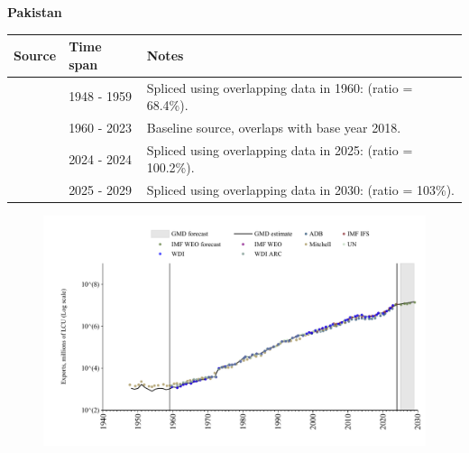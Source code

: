 \documentclass[12pt,a4paper,landscape]{article}
\begin{document}
\begin{adjustbox}{max totalsize={\paperwidth}{\paperheight},center}
\begin{minipage}[t][\textheight][t]{\textwidth}
\vspace*{0.5cm}
{}
\begin{center}
{\Large\bfseries Pakistan}
\end{center}
\vspace{0.5cm}
\begin{table}[H]
\centering
\small
\begin{tabular}{|l|l|l|}
\hline
\textbf{Source} & \textbf{Time span} & \textbf{Notes} \\
\hline
\rowcolor{white}\cite{Mitchell}& 1948 - 1959 &Spliced using overlapping data in 1960: (ratio = 68.4\%).\\
\rowcolor{lightgray}\cite{WDI}& 1960 - 2023 &Baseline source, overlaps with base year 2018.\\
\rowcolor{white}\cite{IMF_IFS}& 2024 - 2024 &Spliced using overlapping data in 2025: (ratio = 100.2\%).\\
\rowcolor{lightgray}\cite{IMF_WEO_forecast}& 2025 - 2029 &Spliced using overlapping data in 2030: (ratio = 103\%).\\
\hline
\end{tabular}
\end{table}
\begin{figure}[H]
\centering
\includegraphics[width=\textwidth,height=0.6\textheight,keepaspectratio]{graphs/PAK_exports.pdf}
\end{figure}
\end{minipage}
\end{adjustbox}
\end{document}
